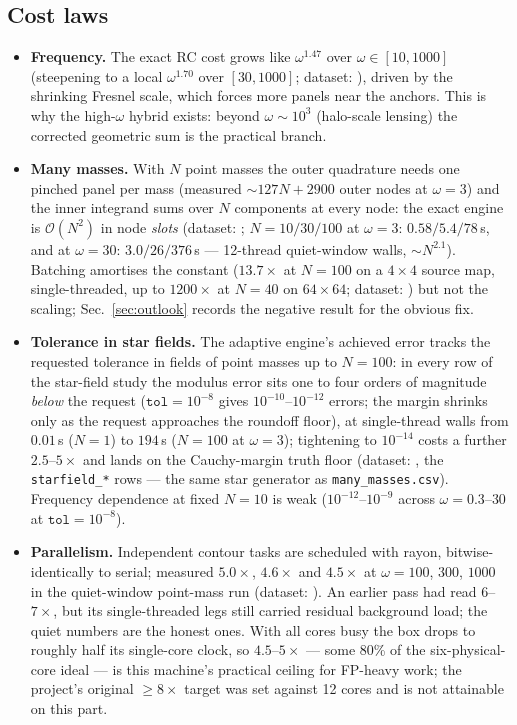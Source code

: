 \documentclass[11pt,a4paper]{article}
\begin{document}
\subsection{Cost laws}
\begin{itemize}
\item \textbf{Frequency.}  The exact RC cost grows like
  $\omega^{1.47}$ over $\omega \in [10, 1000]$ (steepening to a local
  $\omega^{1.70}$ over $[30, 1000]$; dataset:
  ), driven by the shrinking
  Fresnel scale, which forces more panels near the anchors.  This is why
  the high-$\omega$ hybrid exists: beyond $\omega\sim 10^{3}$
  (halo-scale lensing) the corrected geometric sum is the practical branch.
\item \textbf{Many masses.}  With $N$ point masses the outer quadrature
  needs one pinched panel per mass (measured ${\sim}127N + 2900$ outer
  nodes at $\omega = 3$) and the inner integrand sums over $N$ components at
  every node: the exact engine is $\mathcal O(N^2)$ in node \emph{slots}
  (dataset: ;
  $N = 10/30/100$ at $\omega = 3$: $0.58/5.4/78$\,s, and at $\omega = 30$:
  $3.0/26/376$\,s --- 12-thread quiet-window walls, ${\sim}N^{2.1}$).
  Batching amortises the constant ($13.7\times$ at $N=100$ on a $4\times4$
  source map, single-threaded, up to $1200\times$ at $N=40$ on
  $64\times64$; dataset: ) but not
  the scaling; Sec.~\ref{sec:outlook} records the negative result for the
  obvious fix.
\item \textbf{Tolerance in star fields.}  The adaptive engine's achieved
  error tracks the requested tolerance in fields of point masses up to
  $N = 100$: in every row of the star-field study the modulus error sits
  one to four orders of magnitude \emph{below} the request ($\texttt{tol}
  = 10^{-8}$ gives $10^{-10}$--$10^{-12}$ errors; the margin shrinks only
  as the request approaches the roundoff floor), at single-thread walls
  from $0.01$\,s ($N=1$) to $194$\,s ($N=100$ at $\omega = 3$);
  tightening to $10^{-14}$ costs a further $2.5$--$5\times$ and lands on
  the Cauchy-margin truth floor (dataset:
  , the \texttt{starfield\_*}
  rows — the same star generator as \texttt{many\_masses.csv}).
  Frequency dependence at fixed $N=10$ is weak ($10^{-12}$--$10^{-9}$
  across $\omega = 0.3$--$30$ at $\texttt{tol} = 10^{-8}$).
\item \textbf{Parallelism.}  Independent contour tasks are scheduled with
  rayon, bitwise-identically to serial; measured $5.0\times$, $4.6\times$
  and $4.5\times$ at $\omega = 100$, $300$, $1000$ in the quiet-window
  point-mass run (dataset: ).
  An earlier pass had read $6$--$7\times$, but its single-threaded legs
  still carried residual background load; the quiet numbers are the honest
  ones.  With all cores busy the box drops to roughly half its single-core
  clock, so $4.5$--$5\times$ --- some 80\% of the six-physical-core ideal
  --- is this machine's practical ceiling for FP-heavy work; the project's
  original $\ge 8\times$ target was set against 12 cores and is not
  attainable on this part.
\end{itemize}
\end{document}
